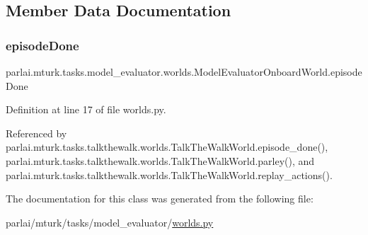 \subsection{Member Data Documentation}
\mbox{\label{classparlai_1_1mturk_1_1tasks_1_1model__evaluator_1_1worlds_1_1ModelEvaluatorOnboardWorld_a24629697aabaa6c6127d6cb0681e9cbd}} 
\subsubsection{\texorpdfstring{episode\+Done}{episodeDone}}
{\footnotesize\ttfamily parlai.\+mturk.\+tasks.\+model\+\_\+evaluator.\+worlds.\+Model\+Evaluator\+Onboard\+World.\+episode\+Done}



Definition at line 17 of file worlds.\+py.



Referenced by parlai.\+mturk.\+tasks.\+talkthewalk.\+worlds.\+Talk\+The\+Walk\+World.\+episode\+\_\+done(), parlai.\+mturk.\+tasks.\+talkthewalk.\+worlds.\+Talk\+The\+Walk\+World.\+parley(), and parlai.\+mturk.\+tasks.\+talkthewalk.\+worlds.\+Talk\+The\+Walk\+World.\+replay\+\_\+actions().



The documentation for this class was generated from the following file\+:\begin{DoxyCompactItemize}
\item 
parlai/mturk/tasks/model\+\_\+evaluator/\hyperlink{parlai_2mturk_2tasks_2model__evaluator_2worlds_8py}{worlds.\+py}\end{DoxyCompactItemize}
